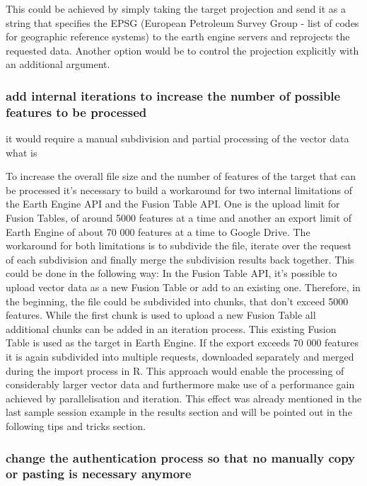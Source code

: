\documentclass[11pt,twoside,a4paper,final]{report}
\begin{document}
 
This could be achieved by simply taking the target projection and send it as a string that specifies the EPSG (European Petroleum Survey Group - list of codes for geographic reference systems) to the earth engine servers and reprojects the requested data. Another option would be to control the projection explicitly with an additional argument.

\subsubsection{add internal iterations to increase the number of possible features to be processed}


it would require a manual subdivision and partial processing of the vector data what is 

To increase the overall file size and the number of features of the target that can be processed it's necessary to build a workaround for two internal limitations of the Earth Engine API and the Fusion Table API. One is the upload limit for Fusion Tables, of around 5000 features at a time and another an export limit of Earth Engine of about 70 000 features at a time to Google Drive. The workaround for both limitations is to subdivide the file, iterate over the request of each subdivision and finally merge the subdivision results back together. This could be done in the following way: In the Fusion Table API, it's possible to upload vector data as a new Fusion Table or add to an existing one. Therefore, in the beginning, the file could be subdivided into chunks, that don't exceed 5000 features. While the first chunk is used to upload a new Fusion Table all additional chunks can be added in an iteration process. This existing Fusion Table is used as the target in Earth Engine. If the export exceeds 70 000 features it is again subdivided into multiple requests, downloaded separately and merged during the import process in R. This approach would enable the processing of considerably larger vector data and furthermore make use of a performance gain achieved by parallelisation and iteration. This effect was already mentioned in the last sample session example in the results section and will be pointed out in the following tips and tricks section.

\subsubsection{change the authentication process so that no manually copy or pasting is necessary anymore}
\end{document}
